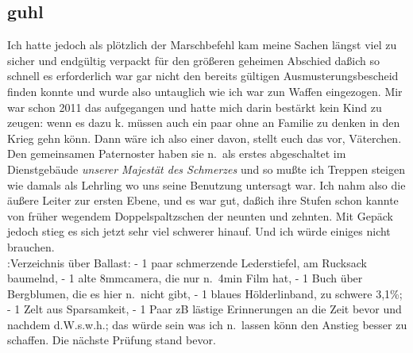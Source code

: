 \documentclass[
]{article}
\author{}
\date{\vspace{-2.5em}}
\begin{document}
\subsection{guhl}\label{guhl}

Ich hatte jedoch als plötzlich der Marschbefehl kam meine Sachen längst
viel zu sicher und endgültig verpackt für den größeren geheimen Abschied
daßich so schnell es erforderlich war gar nicht den bereits gültigen
Ausmusterungsbescheid finden konnte und wurde also untauglich wie ich
war zun Waffen eingezogen. Mir war schon 2011 das aufgegangen und hatte
mich darin bestärkt kein Kind zu zeugen: wenn es dazu k. müssen auch ein
paar ohne an Familie zu denken in den Krieg gehn könn. Dann wäre ich
also einer davon, stellt euch das vor, Väterchen.\\
Den gemeinsamen Paternoster haben sie n.~als erstes abgeschaltet im
Dienstgebäude \emph{unserer Majestät des Schmerzes} und so mußte ich
Treppen steigen wie damals als Lehrling wo uns seine Benutzung untersagt
war. Ich nahm also die äußere Leiter zur ersten Ebene, und es war gut,
daßich ihre Stufen schon kannte von früher wegendem Doppelspaltzschen
der neunten und zehnten. Mit Gepäck jedoch stieg es sich jetzt sehr viel
schwerer hinauf. Und ich würde einiges nicht brauchen.\\
:Verzeichnis über Ballast: - 1 paar schmerzende Lederstiefel, am
Rucksack baumelnd, - 1 alte 8mmcamera, die nur n.~4min Film hat, - 1
Buch über Bergblumen, die es hier n.~nicht gibt, - 1 blaues
Hölderlinband, zu schwere 3,1\%; - 1 Zelt aus Sparsamkeit, - 1 Paar zB
lästige Erinnerungen an die Zeit bevor und nachdem d.W.s.w.h.; das würde
sein was ich n.~lassen könn den Anstieg besser zu schaffen. Die nächste
Prüfung stand bevor.
\end{document}
